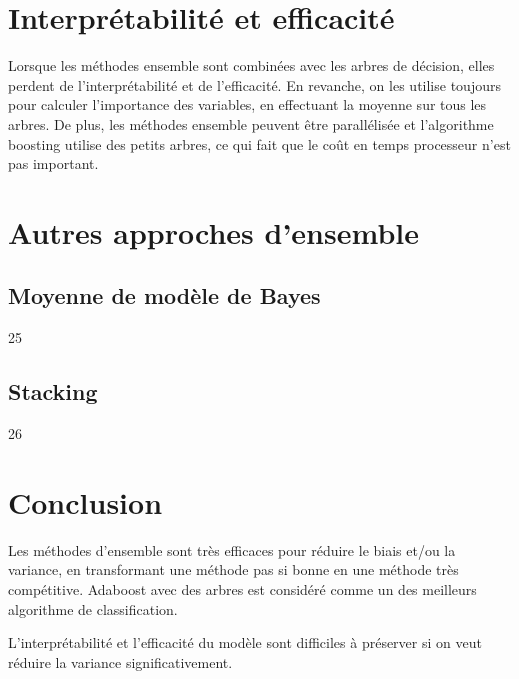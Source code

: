 \section{Interprétabilité et efficacité}
	
Lorsque les méthodes ensemble sont combinées avec les arbres de décision, elles perdent de l'interprétabilité et de l'efficacité. En revanche, on les utilise toujours pour calculer l'importance des variables, en effectuant la moyenne sur tous les arbres. De plus, les méthodes ensemble peuvent être parallélisée et l'algorithme boosting utilise des petits arbres, ce qui fait que le coût en temps processeur n'est pas important.
	
		
	
	
\section{Autres approches d'ensemble}
	\subsection{Moyenne de modèle de Bayes}
	25
	\subsection{Stacking}
	26
	
\section{Conclusion}

Les méthodes d'ensemble sont très efficaces pour réduire le biais et/ou la variance, en transformant une méthode pas si bonne en une méthode très compétitive. Adaboost avec des arbres est considéré comme un des meilleurs algorithme de classification.

L'interprétabilité et l'efficacité du modèle sont difficiles à préserver si on veut réduire la variance significativement.